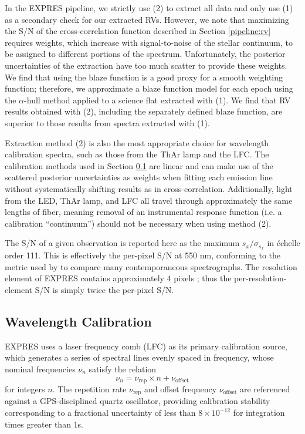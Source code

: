 In the EXPRES pipeline, we strictly use (2) to extract all data and only use (1) as a secondary check for our extracted RVs. However, we note that maximizing the S/N of the cross-correlation function described in Section \ref{pipeline:rv} requires weights, which increase with signal-to-noise of the stellar continuum, to be assigned to different portions of the spectrum. Unfortunately, the posterior uncertainties of the extraction have too much scatter to provide these weights. We find that using the blaze function is a good proxy for a smooth weighting function; therefore, we approximate a blaze function model for each epoch using the $\alpha$-hull method \citep{xu_modeling_2019} applied to a science flat extracted with (1). We find that RV results obtained with (2), including the separately defined blaze function, are superior to those results from spectra extracted with (1).

Extraction method (2) is also the most appropriate choice for wavelength calibration spectra, such as those from the ThAr lamp and the LFC. The calibration methods used in Section \ref{pipeline:wavelength-calibration} are linear and can make use of the scattered posterior uncertainties as weights when fitting each emission line without systematically shifting results as in cross-correlation. Additionally, light from the LED, ThAr lamp, and LFC all travel through approximately the same lengths of fiber, meaning removal of an instrumental response function (i.e. a calibration ``continuum'') should not be necessary when using method (2).

The S/N of a given observation is reported here as the maximum $s_x / \sigma_{s_x}$ in \'echelle order 111. This is effectively the per-pixel S/N at 550 nm, conforming to the metric used by \citet{fischer_state_2016} to compare many contemporaneous spectrographs. The resolution element of EXPRES contains approximately 4 pixels \citep{jurgenson_expres_2016}; thus the per-resolution-element S/N is simply twice the per-pixel S/N.

\subsection{Wavelength Calibration}
\label{pipeline:wavelength-calibration}

EXPRES uses a laser frequency comb (LFC) as its primary calibration source, which generates a series of spectral lines evenly spaced in frequency, whose nominal frequencies $\nu_n$ satisfy the relation
\begin{equation}
\nu_n = \nu_\text{rep} \times n + \nu_\text{offset}
\label{eq:lfc}
\end{equation}
for integers $n$. The repetition rate $\nu_\text{rep}$ and offset frequency $\nu_\text{offset}$ are referenced against a GPS-disciplined quartz oscillator, providing calibration stability corresponding to a fractional uncertainty of less than $8\times10^{-12}$ for integration times greater than 1\si{\second}.

